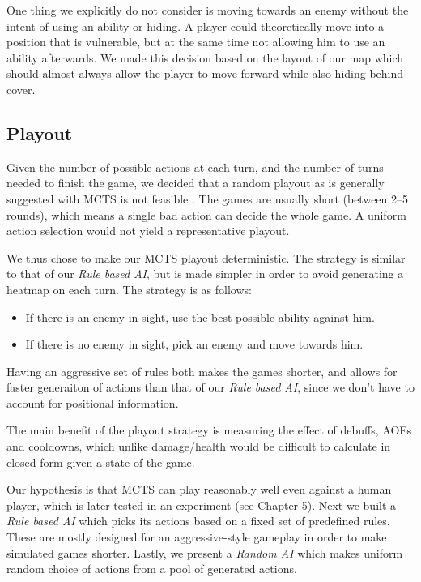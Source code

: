 One thing we explicitly do not consider is moving towards an enemy without the intent
of using an ability or hiding. A player could theoretically move into a position
that is vulnerable, but at the same time not allowing him to use an ability afterwards.
We made this decision based on the layout of our map which should
almost always allow the player to move forward while also hiding behind cover.

\subsection{Playout}

Given the number of possible actions at each turn, and the number of turns
needed to finish the game, we decided that a random playout as is generally
suggested with MCTS is not feasible \citep{mcts-survey}. The games
are usually short (between 2--5 rounds), which means a single bad action can decide
the whole game. A uniform action selection would not yield a representative playout.

We thus chose to make our MCTS playout deterministic. The strategy
is similar to that of our \emph{Rule based AI}, but is made simpler in order
to avoid generating a heatmap on each turn. The strategy is as follows:

\begin{itemize}
\item If there is an enemy in sight, use the best possible ability against him.
\item If there is no enemy in sight, pick an enemy and move towards him.
\end{itemize}

Having an aggressive set of rules both makes the games shorter, and allows for faster
generaiton of actions than that of our \emph{Rule based AI}, since we don't have to account
for positional information.

The main benefit of the playout strategy is measuring the effect of debuffs, AOEs and cooldowns,
which unlike damage/health would be difficult to calculate in closed form given a state of the game.

Our hypothesis is that MCTS can play reasonably well even against a human
player, which is later tested in an experiment (see
\hyperref[chapter05]{Chapter 5}).  Next we built a \emph{Rule based AI} which
picks its actions based on a fixed set of predefined rules. These are mostly
designed for an aggressive-style gameplay in order to make simulated games
shorter. Lastly, we present a \emph{Random AI} which makes uniform random
choice of actions from a pool of generated actions.


